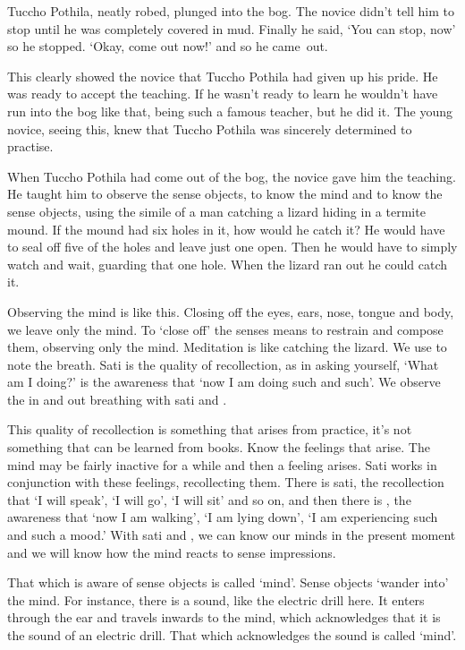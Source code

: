 Tuccho Pothila, neatly robed, plunged into the bog. The novice didn't tell him to stop until he was completely covered in mud. Finally he said, `You can stop, now' so he stopped. `Okay, come out now!' and so he \mbox{came out.}

This clearly showed the novice that Tuccho Pothila had given up his pride. He was ready to accept the teaching. If he wasn't ready to learn he wouldn't have run into the bog like that, being such a famous teacher, but he did it. The young novice, seeing this, knew that Tuccho Pothila was sincerely determined to practise.

When Tuccho Pothila had come out of the bog, the novice gave him the teaching. He taught him to observe the sense objects, to know the mind and to know the sense objects, using the simile of a man catching a lizard hiding in a termite mound. If the mound had six holes in it, how would he catch it? He would have to seal off five of the holes and leave just one open. Then he would have to simply watch and wait, guarding that one hole. When the lizard ran out he could catch it.

Observing the mind is like this. Closing off the eyes, ears, nose, tongue and body, we leave only the mind. To `close off' the senses means to restrain and compose them, observing only the mind. Meditation is like catching the lizard. We use  to note the breath. Sati is the quality of recollection, as in asking yourself, `What am I doing?'  is the awareness that `now I am doing such and such'. We observe the in and out breathing with sati and .

This quality of recollection is something that arises from practice, it's not something that can be learned from books. Know the feelings that arise. The mind may be fairly inactive for a while and then a feeling arises. Sati works in conjunction with these feelings, recollecting them. There is sati, the recollection that `I will speak', `I will go', `I will sit' and so on, and then there is , the awareness that `now I am walking', `I am lying down', `I am experiencing such and such a mood.' With sati and , we can know our minds in the present moment and we will know how the mind reacts to sense impressions.

That which is aware of sense objects is called `mind'. Sense objects `wander into' the mind. For instance, there is a sound, like the electric drill here. It enters through the ear and travels inwards to the mind, which acknowledges that it is the sound of an electric drill. That which acknowledges the sound is called `mind'.

